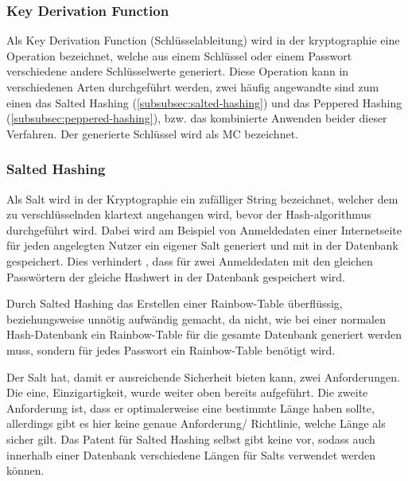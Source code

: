 \subsubsection{Key Derivation Function}\label{subsubsec:key-derivation-function}
Als Key Derivation Function (Schlüsselableitung) wird in der \gls{kryptographie} eine Operation bezeichnet, welche aus einem Schlüssel oder einem Passwort verschiedene andere Schlüsselwerte generiert.\autocite[\vglf][]{NIST:800132} Diese Operation kann in verschiedenen Arten durchgeführt werden, zwei häufig angewandte sind zum einen das Salted Hashing (\autoref{subsubsec:salted-hashing}) und das Peppered Hashing (\autoref{subsubsec:peppered-hashing}), bzw. das kombinierte Anwenden beider dieser Verfahren. Der generierte Schlüssel wird als \ac{MC} bezeichnet.


\subsubsection{Salted Hashing}\label{subsubsec:salted-hashing}
Als Salt wird in der Kryptographie ein zufälliger String bezeichnet, welcher dem zu verschlüsselnden \gls{klartext} angehangen wird, bevor der Hash-\gls{algorithmus} durchgeführt wird\autocite[\vglf][]{JoyOfCryptography:2021}. Dabei wird am Beispiel von Anmeldedaten einer Internetseite für jeden angelegten Nutzer ein eigener Salt generiert und mit in der Datenbank gespeichert.
Dies verhindert \uamol, dass für zwei Anmeldedaten mit den gleichen Passwörtern der gleiche Hashwert in der Datenbank gespeichert wird.

Durch Salted Hashing das Erstellen einer \gls{Rainbow-Table} überflüssig, beziehungsweise unnötig aufwändig gemacht, da nicht, wie bei einer normalen Hash-Datenbank ein \gls{Rainbow-Table} für die gesamte Datenbank generiert werden muss, sondern für jedes Passwort ein \gls{Rainbow-Table} benötigt wird\autocite[\vglf][]{JoyOfCryptography:2021}.

Der Salt hat, damit er ausreichende Sicherheit bieten kann, zwei Anforderungen. Die eine, Einzigartigkeit, wurde weiter oben bereits aufgeführt. Die zweite Anforderung ist, dass er optimalerweise eine bestimmte Länge haben sollte, allerdings gibt es hier keine genaue Anforderung/ Richtlinie, welche Länge als sicher gilt. Das Patent für Salted Hashing selbst gibt keine vor\autocite[\vglf][]{patent:saltedHashing}, sodass auch innerhalb einer Datenbank verschiedene Längen für Salts verwendet werden können.

